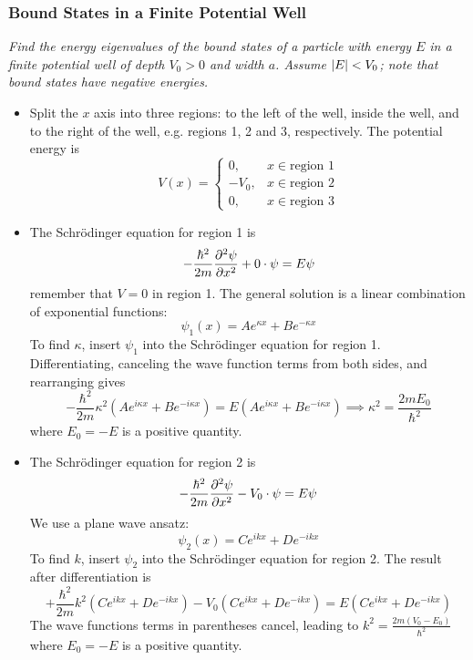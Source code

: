 \documentclass[11pt, a4paper]{article}
\newcommand{\schro}{Schr\"{o}dinger\xspace}
\begin{document}
\subsubsection{Bound States in a Finite Potential Well}
\textit{Find the energy eigenvalues of the bound states of a particle with energy $ E $ in a finite potential well of depth $ V_{0} > 0 $ and width $ a $. Assume $ \abs{E} < V_{0} $; note that bound states have negative energies.}
\begin{itemize}
	\item Split the $ x $ axis into three regions: to the left of the well, inside the well, and to the right of the well, e.g. regions 1, 2 and 3, respectively. The potential energy is
	\begin{equation*}
		V(x) =
		\begin{cases}
			0, & x \in \text{region 1}\\
			- V_{0}, & x \in \text{region 2}\\
			0, & x \in \text{region 3}
		\end{cases}
	\end{equation*}
	
	\item The \schro equation for region 1 is
	\begin{equation*}
		- \frac{\hbar^{2}}{2m}\pdv[2]{\psi}{x} + 0 \cdot \psi = E \psi 
	\end{equation*}
	remember that $ V = 0 $ in region 1. The general solution is a linear combination of exponential functions:
	\begin{equation*}
		\psi_{1}(x) = A e^{\kappa x} + B e^{- \kappa x}
	\end{equation*}
	To find $ \kappa $, insert $ \psi_{1} $ into the \schro equation for region 1. Differentiating, canceling the wave function terms from both sides, and rearranging gives
	\begin{equation*}
		-\frac{\hbar^{2}}{2m} \kappa^{2}\left(Ae^{i\kappa x} + B e^{- i\kappa x}\right) = E \left(A e^{i\kappa x} + B e^{- i\kappa x}\right) \implies \kappa^{2} = \frac{2mE_{0}}{\hbar^{2}}
	\end{equation*}
	where $ E_{0} = - E $ is a positive quantity.
	
	\item The \schro equation for region 2 is
	\begin{equation*}
		- \frac{\hbar^{2}}{2m}\pdv[2]{\psi}{x} - V_{0} \cdot \psi = E \psi
	\end{equation*}
	We use a plane wave ansatz:
	\begin{equation*}
		\psi_{2}(x) = Ce^{ikx} + De^{-ikx}
	\end{equation*}
	To find $ k $, insert $ \psi_{2} $ into the \schro equation for region 2. The result after differentiation is
	\begin{equation*}
		+\frac{\hbar^{2}}{2m} k^{2}\left(Ce^{ik x} + D e^{- ik x}\right) - V_{0}\left(C e^{ik x} + D e^{- ik x}\right)  = E \left(C e^{ik x} + D e^{- ik x}\right) 
	\end{equation*}
	The wave functions terms in parentheses cancel, leading to $ k^{2} = \frac{2m(V_{0}-E_{0})}{\hbar^{2}} $ where $ E_{0} = - E $ is a positive quantity.
	

\end{itemize}
\end{document}
